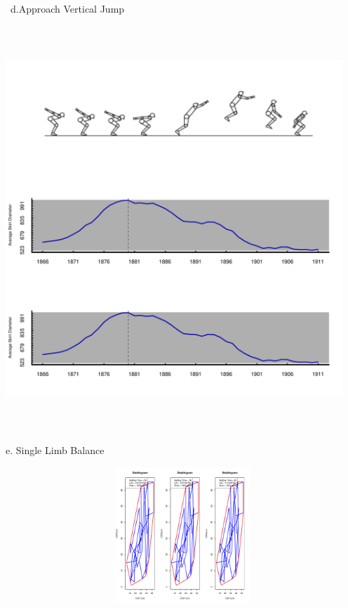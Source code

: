 \documentclass{article}\usepackage[]{graphicx}\usepackage[]{color}
\newenvironment{knitrout}{}{} %
\begin{document}
\newpage
\
d.Approach Vertical Jump
\begin{knitrout}
\color{fgcolor}

\includegraphics[width=5in,height=6in]{figure/latex-unnamed-chunk-8-1} \hfill{}



\end{knitrout}

e. Single Limb Balance
\begin{knitrout}
\color{fgcolor}

\includegraphics[width=6in,height=2in]{figure/latex-unnamed-chunk-9-1} \hfill{}



\end{knitrout}
\end{document}
